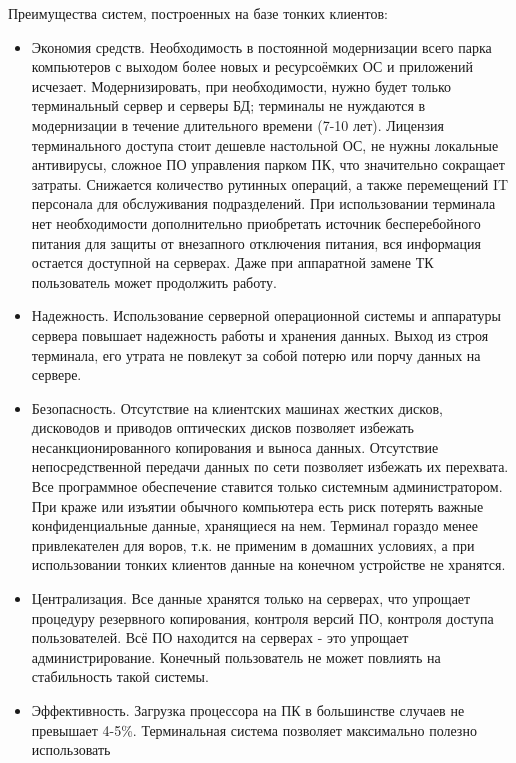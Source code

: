 Преимущества систем, построенных на базе тонких клиентов:
\begin{itemize}
    \item   Экономия средств. Необходимость в постоянной модернизации всего парка
        компьютеров с выходом более новых и ресурсоёмких ОС и приложений исчезает.
        Модернизировать, при необходимости, нужно будет только терминальный сервер и
        серверы БД; терминалы не нуждаются в модернизации в течение длительного времени
        (7-10 лет). Лицензия терминального доступа стоит дешевле настольной ОС, не нужны
        локальные антивирусы, сложное ПО управления парком ПК, что значительно сокращает
        затраты. Снижается количество рутинных операций, а также перемещений IT
        персонала для обслуживания подразделений. При использовании терминала нет
        необходимости дополнительно приобретать источник бесперебойного питания для
        защиты от внезапного отключения питания, вся информация остается доступной на
        серверах. Даже при аппаратной замене ТК пользователь может продолжить работу.
    \item   Надежность. Использование серверной операционной системы и аппаратуры
        сервера повышает надежность работы и хранения данных. Выход из строя терминала,
        его утрата не повлекут за собой потерю или порчу данных на сервере.
    \item   Безопасность. Отсутствие на клиентских машинах жестких дисков, дисководов и
        приводов оптических дисков позволяет избежать несанкционированного копирования и
        выноса данных. Отсутствие непосредственной передачи данных по сети позволяет
        избежать их перехвата. Все программное обеспечение ставится только системным
        администратором. При краже или изъятии обычного компьютера есть риск потерять
        важные конфиденциальные данные, хранящиеся на нем. Терминал гораздо менее
        привлекателен для воров, т.к. не применим в домашних условиях, а при
        использовании тонких клиентов данные на конечном устройстве не хранятся.
    \item   Централизация. Все данные хранятся только на серверах, что упрощает
        процедуру резервного копирования, контроля версий ПО, контроля доступа
        пользователей. Всё ПО находится на серверах - это упрощает администрирование.
        Конечный пользователь не может повлиять на стабильность такой системы.
    \item   Эффективность. Загрузка процессора на ПК в большинстве случаев не превышает
        4-5\%. Терминальная система позволяет максимально полезно использовать

\end{itemize}
